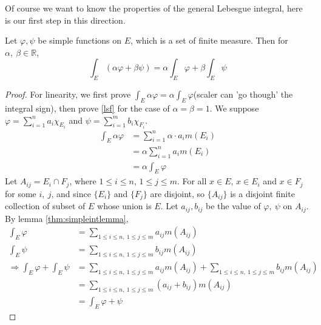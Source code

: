 \documentclass[lang=en, 12pt]{elegantbook}
\newcommand{\RR}{\mathbb{R}}
\begin{document}
            Of course we want to know the properties of the general Lebesgue integral, here is our first step in this direction.
            \begin{proposition}
                Let $\varphi, \psi$ be simple functions on $E$, which is a set of finite measure. Then for $\alpha, \ \beta \in \RR$,
                \begin{equation}
                    \int_E (\alpha \varphi + \beta \psi) = \alpha \int_E \varphi + \beta \int_E \psi \label{lsf}
                \end{equation}
            \end{proposition} 
            \begin{proof}
                For linearity, we first prove $\int_E \alpha \varphi = \alpha \int_E \varphi$(scaler can 'go though' the integral sign), then prove \eqref{lsf} for the case of
            $\alpha=\beta = 1$. We suppose $\varphi = \sum_{i=1}^n a_i \chi_{E_i}$ and $\psi = \sum_{i=1}^m b_i \chi_{F_i}$.
            \begin{equation}
                \begin{aligned}
                    \int_E \alpha \varphi &= \sum_{i=1}^{n} \alpha \cdot a_i m(E_i) \\
                    &= \alpha \sum_{i=1}^{n} a_i m(E_i)\\
                    &= \alpha \int_E \varphi
                \end{aligned}
            \end{equation}
                Let $A_{ij} = E_i \cap F_j$, where $1\leq i\leq n$, $1 \leq j \leq m$. For all $x \in E$, $x \in E_i$ and $x \in F_j$ for 
            some $i, \ j$, and since $\{E_i\}$ and $\{F_j\}$ are disjoint, so $\{A_{ij}\}$ is a disjoint finite collection of subset of $E$
            whose union is $E$. Let $a_{ij}, b_{ij}$ be the value of $\varphi, \ \psi$ on $A_{ij}$. By lemma \ref{thm:simpleintlemma},
            \begin{equation*}
                \begin{aligned}
                    \int_E \varphi &= \sum_{1\leq i \leq n, \ 1 \leq j \leq m} a_{ij} m(A_{ij}) \\
                    \int_E \psi &= \sum_{1\leq i \leq n, \ 1 \leq j \leq m} b_{ij} m(A_{ij}) \\
                    \Rightarrow \int_E \varphi + \int_E \psi &= \sum_{1\leq i \leq n, \ 1 \leq j \leq m} a_{ij} m(A_{ij}) +\sum_{1\leq i \leq n, \ 1 \leq j \leq m} b_{ij} m(A_{ij}) \\
                    &=\sum_{1\leq i \leq n, \ 1 \leq j \leq m} (a_{ij} + b_{ij}) m(A_{ij})\\
                    &= \int_E \varphi +\psi 
                \end{aligned}
            \end{equation*}
            \end{proof}
\end{document}
